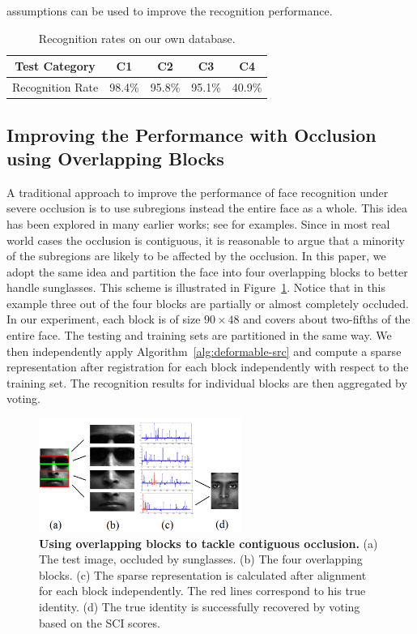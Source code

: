 \documentclass[10pt,journal,letterpaper,compsoc]{IEEEtran} %
\begin{document}
assumptions can be used to improve the recognition performance.
\begin{table}[h]
\vspace{0mm}
\centering \caption{Recognition rates on our own
database.} \vspace{0mm}
\begin{tabular}{|c|c|c|c|c| }
\hline
Test Category & C1 & C2 & C3 & C4  \\
\hline
\hline
Recognition Rate & 98.4\% & 95.8\% & 95.1\% & 40.9\% \\
\hline
\end{tabular}
\label{tab:UIUC-recognition}
\vspace{0mm}
\end{table}

\subsection{Improving the Performance with Occlusion using Overlapping Blocks}
A traditional approach to improve the performance of face
recognition under severe occlusion is to use subregions instead
the entire face as a whole. This idea has been explored in many
earlier works; see \cite{Pentland1994-CVPR, Wright2009-PAMI}
for examples. Since in most real world cases the occlusion is contiguous, it is reasonable to argue that a minority of the
subregions are likely to be affected by the occlusion. In this
paper, we adopt the same idea and partition the face into four
overlapping blocks to better handle sunglasses. This
scheme is illustrated in Figure~\ref{fig:occ-block}. Notice
that in this example three out of the four blocks are partially
or almost completely occluded. In our experiment, each block is
of size $90\times 48$ and covers about two-fifths of the entire
face. The testing and training sets are partitioned in the same
way. We then independently apply
Algorithm~\ref{alg:deformable-src} and compute a sparse
representation after registration for each block independently
with respect to the training set. The recognition
results for individual blocks are then aggregated by voting.

\begin{figure}
\centering
\includegraphics[width=2.6in]{figures_pami/occ_block.png}
\caption{{\bf Using overlapping blocks to tackle contiguous occlusion.} (a) The test image, occluded by sunglasses. (b) The four overlapping blocks. (c) The sparse representation is calculated after alignment for each block independently. The red lines correspond to his true identity. (d) The true identity is successfully recovered by voting based on the SCI scores.}
\label{fig:occ-block}
\vspace{0mm}
\end{figure}
\end{document}
